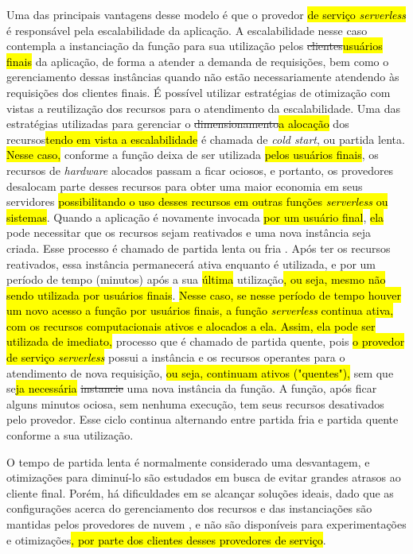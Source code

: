 \documentclass[10pt,conference]{IEEEtran}
\begin{document}
Uma das principais vantagens desse modelo é que o provedor \hl{de serviço \textit{serverless}} é responsável pela escalabilidade da aplicação. A escalabilidade nesse caso contempla a instanciação da função para sua utilização pelos \st{clientes}\hl{usuários finais} da aplicação, de forma a atender a demanda de requisições, bem como o gerenciamento dessas instâncias quando não estão necessariamente atendendo às requisições dos clientes finais. É possível utilizar estratégias de otimização com vistas a reutilização dos recursos para o atendimento da escalabilidade.
Uma das estratégias utilizadas para gerenciar o \st{dimensionamento}\hl{a alocação} dos recursos\hl{tendo em vista a escalabilidade} é chamada de \textit{cold start}, ou partida lenta. 
\hl{Nesse caso,} conforme a função deixa de ser utilizada \hl{pelos usuários finais}, os recursos de \textit{hardware} alocados passam a ficar ociosos, e portanto, os provedores desalocam parte desses recursos para obter uma maior economia em seus servidores \hl{possibilitando o uso desses recursos em outras funções \textit{serverless} ou sistemas}. Quando a aplicação é novamente invocada \hl{por um usuário final}, \hl{ela} pode necessitar que os recursos sejam reativados e uma nova instância seja criada. Esse processo é chamado de partida lenta ou fria \cite{vahidinia_2020_cold_start}. Após ter os recursos reativados, essa instância permanecerá ativa enquanto é utilizada, e por um período de tempo (minutos) após a sua \hl{última} utilização\hl{, ou seja, mesmo não sendo utilizada por usuários finais}. \hl{Nesse caso, se nesse período de tempo houver um novo acesso a função por usuários finais, a função \textit{serverless} continua ativa, com os recursos computacionais ativos e alocados a ela. Assim, ela pode ser utilizada de imediato,} processo que é chamado de partida quente, pois \hl{o provedor de serviço \textit{serverless}} possui a instância e os recursos operantes \cite{Raje_2023_cold_warm_start} para o atendimento de nova requisição, \hl{ou seja, continuam ativos ("quentes"),} sem que se\hl{ja necessária} \st{instancie} uma nova instância da função. A função, após ficar alguns minutos ociosa, sem nenhuma execução, tem seus recursos desativados pelo provedor. Esse ciclo continua alternando entre partida fria e partida quente conforme a sua utilização.

O tempo de partida lenta é normalmente considerado uma desvantagem, e otimizações para diminuí-lo são estudados em busca de evitar grandes atrasos ao cliente final. Porém, há dificuldades em se alcançar soluções ideais, dado que as configurações acerca do gerenciamento dos recursos e das instanciações são mantidas pelos provedores de nuvem \cite{vahidinia_2020_cold_start, kumari_2022_mitigating_cold_start, vahidinia_2023_mitigating_cold_start, dantas_2022_reducing_cold_start}, e não são disponíveis para experimentações e otimizações\hl{, por parte dos clientes desses provedores de serviço}.
\end{document}
